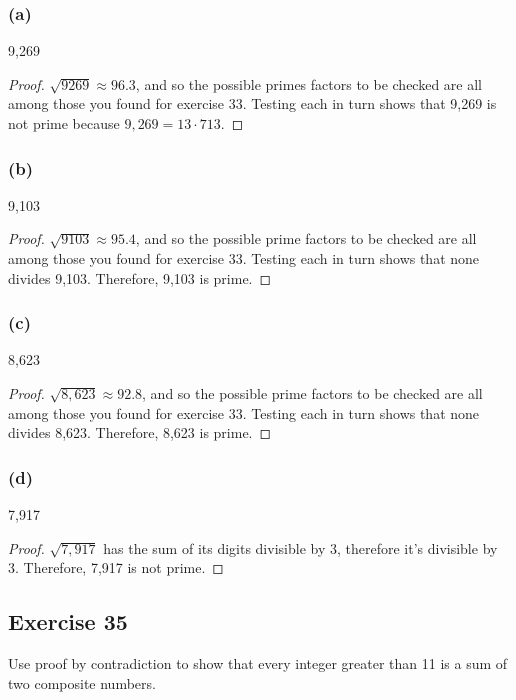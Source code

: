 \documentclass[14pt]{extarticle}
\begin{document}
\subsubsection{(a)}
9,269

\begin{proof}
    $\sqrt{9269} \approx 96.3$, and so the possible primes factors to be checked are all among those you found for exercise 33. Testing each in turn shows that 9,269 is not prime because $9,269 = 13 \cdot 713$.

\end{proof}

\subsubsection{(b)}
9,103

\begin{proof}
    $\sqrt{9103} \approx 95.4$, and so the possible prime factors to be checked are all among those you found for exercise 33. Testing each in turn shows that none divides 9,103. Therefore, 9,103 is prime.
\end{proof}

\subsubsection{(c)}
8,623

\begin{proof}
    $\sqrt{8,623} \approx 92.8$, and so the possible prime factors to be checked are all among those you found for exercise 33. Testing each in turn shows that none divides
    8,623. Therefore, 8,623 is prime.
\end{proof}

\subsubsection{(d)}
7,917

\begin{proof}
    $\sqrt{7,917}$ has the sum of its digits divisible by 3, therefore it's divisible by 3. Therefore, 7,917 is not prime.
\end{proof}

\subsection{Exercise 35}
Use proof by contradiction to show that every integer greater than 11 is a sum of two composite numbers.
\end{document}
